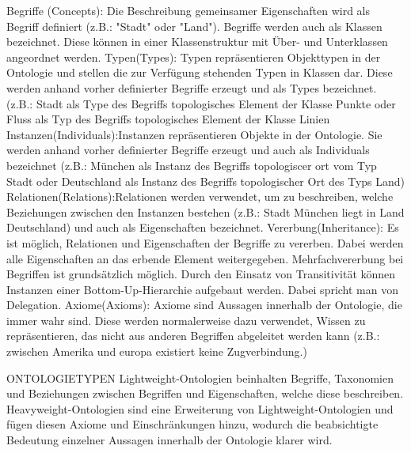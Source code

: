     Begriffe (Concepts): Die Beschreibung gemeinsamer Eigenschaften wird als Begriff definiert (z.B.: "Stadt" oder "Land"). Begriffe werden auch als Klassen bezeichnet. Diese können in einer Klassenstruktur mit Über- und Unterklassen angeordnet werden.
	Typen(Types): Typen repräsentieren Objekttypen in der Ontologie und stellen die zur Verfügung stehenden Typen in Klassen dar. Diese werden anhand vorher definierter Begriffe erzeugt und als Types bezeichnet. (z.B.: Stadt als Type des Begriffs topologisches Element der Klasse Punkte oder Fluss als Typ des Begriffs topologisches Element der Klasse Linien
	Instanzen(Individuals):Instanzen repräsentieren Objekte in der Ontologie. Sie werden anhand vorher definierter Begriffe erzeugt und auch als Individuals bezeichnet (z.B.: München als Instanz des Begriffs topologiscer ort vom Typ Stadt oder Deutschland als Instanz des Begriffs topologischer Ort des Typs Land)
	Relationen(Relations):Relationen werden verwendet, um zu beschreiben, welche Beziehungen zwischen den Instanzen bestehen (z.B.: Stadt München liegt in Land Deutschland) und auch als Eigenschaften bezeichnet.
	Vererbung(Inheritance): Es ist möglich, Relationen und Eigenschaften der Begriffe zu vererben. Dabei werden alle Eigenschaften an das erbende Element weitergegeben. Mehrfachvererbung bei Begriffen ist grundsätzlich möglich. Durch den Einsatz von Transitivität können Instanzen einer Bottom-Up-Hierarchie aufgebaut werden. Dabei spricht man von Delegation.
	Axiome(Axioms): Axiome sind Aussagen innerhalb der Ontologie, die immer wahr sind. Diese werden normalerweise dazu verwendet, Wissen zu repräsentieren, das nicht aus anderen Begriffen abgeleitet werden kann (z.B.: zwischen Amerika und europa existiert keine Zugverbindung.)
	
ONTOLOGIETYPEN
	Lightweight-Ontologien beinhalten Begriffe, Taxonomien und Beziehungen zwischen Begriffen und Eigenschaften, welche diese beschreiben.
	Heavyweight-Ontologien sind eine Erweiterung von Lightweight-Ontologien und fügen diesen Axiome und Einschränkungen hinzu, wodurch die beabsichtigte Bedeutung einzelner Aussagen innerhalb der Ontologie klarer wird.
	
